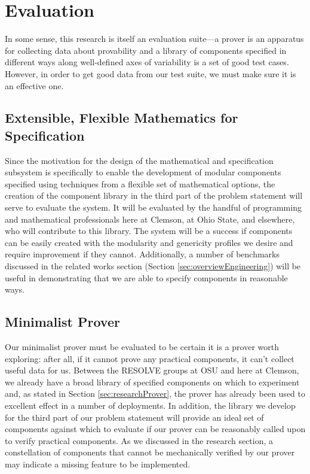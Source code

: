 \chapter{Evaluation}\label{sec:evaluation}
In some sense, this research is itself an evaluation suite---a prover is an apparatus for collecting data about provability and a library of components specified in different ways along well-defined axes of variability is a set of good test cases.  However, in order to get good data from our test suite, we must make sure it is an effective one.

\section{Extensible, Flexible Mathematics for Specification}\label{sec:evalMath}
Since the motivation for the design of the mathematical and specification subsystem is specifically to enable the development of modular components specified using techniques from a flexible set of mathematical options, the creation of the component library in the third part of the problem statement will serve to evaluate the system.  It will be evaluated by the handful of programming and mathematical professionals here at Clemson, at Ohio State, and elsewhere, who will contribute to this library.  The system will be a success if components can be easily created with the modularity and genericity profiles we desire and require improvement if they cannot.  Additionally, a number of benchmarks discussed in the related works section (Section \ref{sec:overviewEngineering}) will be useful in demonstrating that we are able to specify components in reasonable ways.

\section{Minimalist Prover}\label{sec:evalProver}
Our minimalist prover must be evaluated to be certain it is a prover worth exploring: after all, if it cannot prove any practical components, it can't collect useful data for us.  Between the RESOLVE groups at OSU and here at Clemson, we already have a broad library of specified components on which to experiment and, as stated in Section \ref{sec:researchProver}, the prover has already been used to excellent effect in a number of deployments.  In addition, the library we develop for the third part of our problem statement will provide an ideal set of components against which to evaluate if our prover can be reasonably called upon to verify practical components.  As we discussed in the research section, a constellation of components that cannot be mechanically verified by our prover may indicate a missing feature to be implemented.

